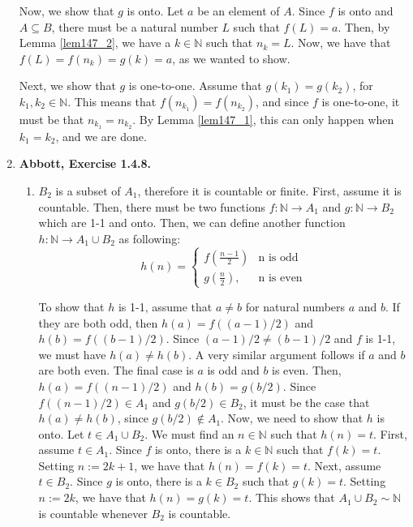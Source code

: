 \documentclass{article}
\newcommand{\N}{\mathbb{N}}
\newcommand{\exc}[2][Abbott]{\item \textbf{#1, Exercise #2.}}
\begin{document}
\begin{enumerate}
	Now, we show that $g$ is onto. Let $a$ be an element of $A$. Since $f$ is onto and $A \subseteq B$, there must be a natural number $L$ such that $f(L) = a$. Then, by Lemma \ref{lem147_2}, we have a $k \in \N$ such that $n_k = L$. Now, we have that $f(L) = f(n_k) = g(k) = a$, as we wanted to show.
					  
	Next, we show that $g$ is one-to-one. Assume that $g(k_1) = g(k_2)$, for $k_1, k_2 \in \N$. This means that $f(n_{k_1}) = f(n_{k_2})$, and since $f$ is one-to-one, it must be that $n_{k_1} = n_{k_2}$. By Lemma \ref{lem147_1}, this can only happen when $k_1 = k_2$, and we are done.
					  
	\exc{1.4.8}
	\begin{enumerate}
		\item $B_2$ is a subset of $A_1$, therefore it is countable or finite. First, assume it is countable. Then, there must be two functions $f : \N \rightarrow A_1$ and $g : \N \rightarrow B_2$ which are 1-1 and onto. Then, we can define another function $h : \N \rightarrow A_1 \cup B_2$ as following:
		      \begin{equation*}
		      	h(n) = \begin{cases}
		      	f(\frac{n-1}{2}) & \text{n is odd} \\
		      	g(\frac{n}{2}), & \text{n is even}
		      	\end{cases}
		      \end{equation*}
		      		      		      	      	      	      	        
		      To show that $h$ is 1-1, assume that $a \neq b$ for natural numbers $a$ and $b$. If they are both odd, then $h(a) = f((a-1)/2)$ and $h(b) = f((b-1)/2)$. Since $(a-1)/2 \neq (b-1)/2$ and $f$ is 1-1, we must have $h(a) \neq h(b)$.
		      A very similar argument follows if $a$ and $b$ are both even. The final case is $a$ is odd and $b$ is even. Then, $h(a) = f((n-1)/2)$ and $h(b) = g(b/2)$. Since $f((n-1)/2) \in A_1$ and $g(b/2) \in B_2$, it must be the case that $h(a) \neq h(b)$, since $g(b/2) \notin A_1$. Now, we need to show that $h$ is onto. Let $t \in A_1 \cup B_2$. We must find an $n \in \N$ such that $h(n) = t$. First, assume $t \in A_1$. Since $f$ is onto, there is a $k \in \N$ such that $f(k) = t$. Setting $n := 2k + 1$, we have that $h(n)=f(k)=t$. Next, assume $t \in B_2$. Since $g$ is onto, there is a $k \in B_2$ such that $g(k) = t$. Setting $n := 2k$, we have that $h(n)=g(k)=t$.
		      This shows that $A_1 \cup B_2 \sim \N$ is countable whenever $B_2$ is countable.
		      		      		      	      	      	      	        

\end{enumerate}
\end{enumerate}
\end{document}
